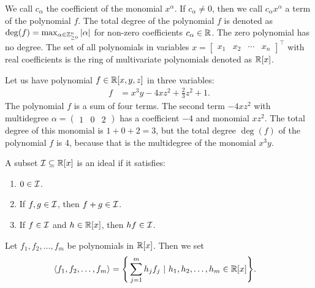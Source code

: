 We call $c_\alpha$ the coefficient of the monomial $x^\alpha$.
If $c_\alpha \neq 0$, then we call $c_\alpha x^\alpha$ a term of the polynomial $f$.
The total degree of the polynomial $f$ is denoted as $\deg(f) = \max_{\alpha\in\mathbb{Z}_{\geq0}^n} |\alpha|$ for non-zero coefficients $c_\alpha\in\mathbb{R}$.
The zero polynomial has no degree.
The set of all polynomials in variables $x = \begin{bmatrix}x_1 & x_2 & \cdots & x_n\end{bmatrix}^\top$ with real coefficients is the ring of multivariate polynomials denoted as $\mathbb{R}[x]$.

\begin{example}
  Let us have polynomial $f \in\mathbb{R}[x, y, z]$ in three variables:
  \begin{align}
    f &= x^3y - 4xz^2 + \frac{2}{3}z^2 + 1.
  \end{align}
  The polynomial $f$ is a sum of four terms.
  The second term $-4xz^2$ with multidegree $\alpha = \begin{pmatrix}1 & 0 & 2\end{pmatrix}$ has a coefficient $-4$ and monomial $xz^2$.
  The total degree of this monomial is $1 + 0 + 2 = 3$, but the total degree $\deg(f)$ of the polynomial $f$ is 4, because that is the multidegree of the monomial $x^3y$.
\end{example}

\begin{definition}
  A subset $\mathcal{I} \subseteq \mathbb{R}[x]$ is an ideal if it satisfies:
  \begin{enumerate}
    \item $0 \in \mathcal{I}$.
    \item If $f, g \in \mathcal{I}$, then $f + g \in \mathcal{I}$.
    \item If $f \in \mathcal{I}$ and $h \in \mathbb{R}[x]$, then $hf \in \mathcal{I}$.
  \end{enumerate}
\end{definition}

\begin{definition}
  Let $f_1, f_2, \ldots, f_m$ be polynomials in $\mathbb{R}[x]$.
  Then we set
  \begin{align}
     \langle f_1, f_2, \ldots, f_m\rangle &= \Bigg\{\sum_{j=1}^mh_jf_j\ |\ h_1, h_2, \ldots, h_m\in\mathbb{R}[x]\Bigg\}.
  \end{align}
\end{definition}

